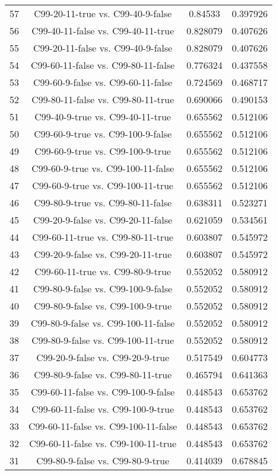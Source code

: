 \documentclass[a4paper,10pt]{article}
\begin{document}
\begin{landscape}
\begin{table}[!htp]
\begin{tabular}{cccc}
57&C99-20-11-true vs. C99-40-9-false&0.84533&0.397926\\
56&C99-40-11-false vs. C99-40-11-true&0.828079&0.407626\\
55&C99-20-11-false vs. C99-40-9-false&0.828079&0.407626\\
54&C99-60-11-false vs. C99-80-11-false&0.776324&0.437558\\
53&C99-60-9-false vs. C99-60-11-false&0.724569&0.468717\\
52&C99-80-11-false vs. C99-80-11-true&0.690066&0.490153\\
51&C99-40-9-true vs. C99-40-11-true&0.655562&0.512106\\
50&C99-60-9-true vs. C99-100-9-false&0.655562&0.512106\\
49&C99-60-9-true vs. C99-100-9-true&0.655562&0.512106\\
48&C99-60-9-true vs. C99-100-11-false&0.655562&0.512106\\
47&C99-60-9-true vs. C99-100-11-true&0.655562&0.512106\\
46&C99-80-9-true vs. C99-80-11-false&0.638311&0.523271\\
45&C99-20-9-false vs. C99-20-11-false&0.621059&0.534561\\
44&C99-60-11-true vs. C99-80-11-true&0.603807&0.545972\\
43&C99-20-9-false vs. C99-20-11-true&0.603807&0.545972\\
42&C99-60-11-true vs. C99-80-9-true&0.552052&0.580912\\
41&C99-80-9-false vs. C99-100-9-false&0.552052&0.580912\\
40&C99-80-9-false vs. C99-100-9-true&0.552052&0.580912\\
39&C99-80-9-false vs. C99-100-11-false&0.552052&0.580912\\
38&C99-80-9-false vs. C99-100-11-true&0.552052&0.580912\\
37&C99-20-9-false vs. C99-20-9-true&0.517549&0.604773\\
36&C99-80-9-false vs. C99-80-11-true&0.465794&0.641363\\
35&C99-60-11-false vs. C99-100-9-false&0.448543&0.653762\\
34&C99-60-11-false vs. C99-100-9-true&0.448543&0.653762\\
33&C99-60-11-false vs. C99-100-11-false&0.448543&0.653762\\
32&C99-60-11-false vs. C99-100-11-true&0.448543&0.653762\\
31&C99-80-9-false vs. C99-80-9-true&0.414039&0.678845\\

\end{tabular}
\end{table}
\end{landscape}
\end{document}
